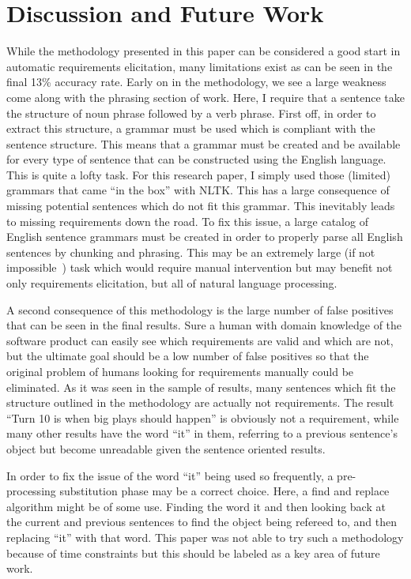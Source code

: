 \documentclass[conference]{IEEEtran}
\begin{document}
\section{Discussion and Future Work}

While the methodology presented in this paper can be considered a good start in automatic requirements elicitation,
many limitations exist as can be seen in the final 13\% accuracy rate. Early on in the methodology, we see a large
weakness come along with the phrasing section of work. Here, I require that a sentence take the structure of noun
phrase followed by a verb phrase. First off, in order to extract this structure, a grammar must be used which is compliant with
the sentence structure. This means that a grammar must be created and be available for every type of sentence that
can be constructed using the English language. This is quite a lofty task. For this research paper, I simply used those
(limited) grammars that came ``in the box'' with NLTK. This has a large consequence of missing potential sentences
which do not fit this grammar. This inevitably leads to missing requirements down the road. To fix this issue, a large
catalog of English sentence grammars must be created in order to properly parse all English sentences by chunking and
phrasing. This may be an extremely large (if not impossible~\cite{shieber1985eac}) task which would require
manual intervention but may benefit not only requirements
elicitation, but all of natural language processing.

A second consequence of this methodology is the large number of false positives that can be seen in the final results.
Sure a human with domain knowledge of the software product can easily see which requirements are valid and which are not,
but the ultimate goal should be a low number of false positives so that the original problem of humans looking for requirements
manually could be eliminated. As it was seen in the sample of results, many sentences which fit the structure outlined in
the methodology are actually not requirements. The result ``Turn 10 is when big plays should happen'' is obviously not
a requirement, while many other results have the word ``it'' in them, referring to a previous sentence's object but become
unreadable given the sentence oriented results.

In order to fix the issue of the word ``it'' being used so frequently, a pre-processing substitution phase may be a correct
choice. Here, a find and replace algorithm might be of some use. Finding the word it and then looking back at the current and
previous sentences to find the  object being refereed to, and then replacing ``it'' with that word. This paper was not able
to try such a methodology because of time constraints but this should be labeled as a key area of future work.
\end{document}
